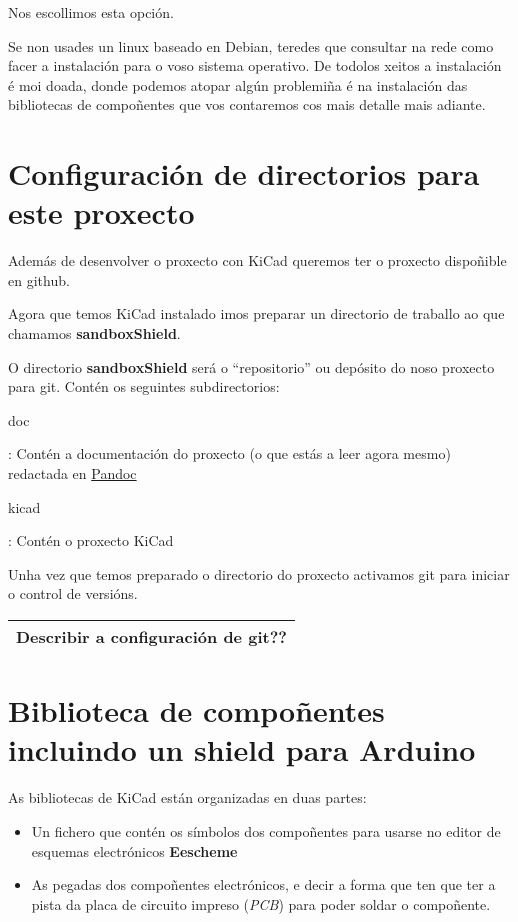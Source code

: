 Nos escollimos esta opción.

Se non usades un linux baseado en Debian, teredes que consultar na rede
como facer a instalación para o voso sistema operativo. De todolos
xeitos a instalación é moi doada, donde podemos atopar algún problemiña
é na instalación das bibliotecas de compoñentes que vos contaremos cos
mais detalle mais adiante.

\section{Configuración de directorios para este
proxecto}\label{configuraciuxf3n-de-directorios-para-este-proxecto}

Además de desenvolver o proxecto con KiCad queremos ter o proxecto
dispoñible en github.

Agora que temos KiCad instalado imos preparar un directorio de traballo
ao que chamamos \textbf{sandboxShield}.

O directorio \textbf{sandboxShield} será o ``repositorio'' ou depósito
do noso proxecto para git. Contén os seguintes subdirectorios:

doc

: Contén a documentación do proxecto (o que estás a leer agora mesmo)
redactada en \href{http://pandoc.org/}{Pandoc}

kicad

: Contén o proxecto KiCad

Unha vez que temos preparado o directorio do proxecto activamos git para
iniciar o control de versións.

\begin{longtable}[c]{@{}l@{}}
\toprule
Describir a configuración de git??\tabularnewline
\bottomrule
\end{longtable}

\section{Biblioteca de compoñentes incluindo un shield para
Arduino}\label{biblioteca-de-compouxf1entes-incluindo-un-shield-para-arduino}

As bibliotecas de KiCad están organizadas en duas partes:

\begin{itemize}
\item
  Un fichero que contén os símbolos dos compoñentes para usarse no
  editor de esquemas electrónicos \textbf{Eescheme}
\item
  As pegadas dos compoñentes electrónicos, e decir a forma que ten que
  ter a pista da placa de circuito impreso (\emph{PCB}) para poder
  soldar o compoñente.
\end{itemize}

